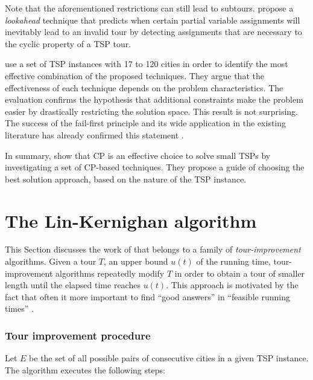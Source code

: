 \documentclass[a4paper,12pt]{article}
\begin{document}
Note that the aforementioned restrictions can still lead to subtours. \citet{Caseau97} propose a \textit{lookahead} technique that predicts when certain partial variable assignments will inevitably lead to an invalid tour by detecting assignments that are necessary to the cyclic property of a TSP tour.

\citet{Caseau97} use a set of TSP instances with 17 to 120 cities in order to identify the most effective combination of the proposed techniques. They argue that the effectiveness of each technique depends on the problem characteristics. The evaluation confirms the hypothesis that additional constraints make the problem easier by drastically restricting the solution space. This result is not surprising. The success of the fail-first principle and its wide application in the existing literature has already confirmed this statement \citep{Golomb65,Brelaz79}.

In summary, \citet{Caseau97} show that CP is an effective choice to solve small TSPs by investigating a set of CP-based techniques. They propose a guide of choosing the best solution approach, based on the nature of the TSP instance.

\section{The Lin-Kernighan algorithm}
\label{sec:linkernighan}
This Section discusses the work of \citet{LinKernighan73} that belongs to a family of \textit{tour-improvement} algorithms. Given a tour $T$, an upper bound $u(t)$ of the running time, tour-improvement algorithms repeatedly modify $T$ in order to obtain a tour of smaller length until the elapsed time reaches $u(t)$. This approach is motivated by the fact that often it more important to find ``good answers'' in ``feasible running times'' \citep{LinKernighan73}. 

\subsubsection*{Tour improvement procedure}
Let $E$ be the set of all possible pairs of consecutive cities in a given TSP instance. The algorithm executes the following steps:
\end{document}
